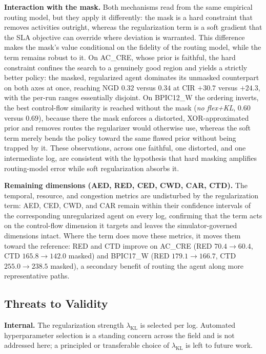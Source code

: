 \documentclass[journal,onecolumn]{IEEEtran}
\begin{document}
\noindent\textbf{Interaction with the mask.}
Both mechanisms read from the same empirical routing model, but they
apply it differently: the mask is a hard constraint that removes
activities outright, whereas the regularization term is a soft gradient
that the SLA objective can override where deviation is warranted. This
difference makes the mask's value conditional on the fidelity of the
routing model, while the term remains robust to it. On AC\_CRE, whose
prior is faithful, the hard constraint confines the search to a genuinely
good region and yields a strictly better policy: the masked, regularized
agent dominates its unmasked counterpart on both axes at once, reaching
NGD $0.32$ versus $0.34$ at CIR $+30.7$ versus $+24.3$, with the per-run
ranges essentially disjoint. On BPIC12\_W the ordering inverts, the best
control-flow similarity is reached without the mask
(\textit{no flex+KL}, $0.60$ versus $0.69$), because there the mask
enforces a distorted, XOR-approximated prior and removes routes the
regularizer would otherwise use, whereas the soft term merely bends the
policy toward the same flawed prior without being trapped by it. These
observations, across one faithful, one distorted, and one intermediate
log, are consistent with the hypothesis that hard masking amplifies
routing-model error while soft regularization absorbs it.

\noindent\textbf{Remaining dimensions (AED, RED, CED, CWD, CAR, CTD).}
The temporal, resource, and congestion metrics are undisturbed by the
regularization term: AED, CED, CWD, and CAR remain within their
confidence intervals of the corresponding unregularized agent on every
log, confirming that the term acts on the control-flow dimension it
targets and leaves the simulator-governed dimensions intact. Where the
term does move these metrics, it moves them toward the reference: RED
and CTD improve on AC\_CRE (RED $70.4 \to 60.4$, CTD $165.8 \to 142.0$
masked) and BPIC17\_W (RED $179.1 \to 166.7$, CTD $255.0 \to 238.5$
masked), a secondary benefit of routing the agent along more
representative paths.

\subsection{Threats to Validity}
\label{subsec:reg_threats}

\noindent\textbf{Internal.}
The regularization strength $\lambda_{\text{KL}}$ is selected per log.
Automated hyperparameter selection is a standing concern across the
field \cite{PrPm_research_directions} and is not addressed here; a principled or transferable choice of
$\lambda_{\text{KL}}$ is left to future work.
\end{document}
